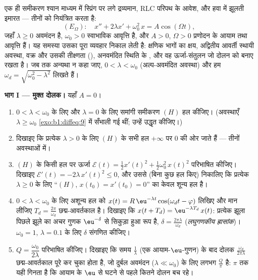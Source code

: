 \begin{problem}\label{pb:b1:diffeq:1}
एक ही समीकरण श्यान माध्यम में स्प्रिंग पर लगे द्रव्यमान, RLC परिपथ के आवेश,
और हवा में झूलती इमारत --- तीनों को नियंत्रित करता है:
\[
(E_\Omega)\colon\quad
x'' + 2\lambda x' + \omega_0^2\,x = A\cos(\Omega t),
\]
जहाँ $\lambda \geq 0$ अवमंदन है, $\omega_0 > 0$ स्वाभाविक आवृत्ति है, और $A
> 0$, $\Omega > 0$ प्रणोदन के आयाम तथा आवृत्ति हैं। यह समस्या उसका पूरा
व्यवहार निकाल लेती है: क्षणिक भागों का क्षय, अद्वितीय आवर्ती स्थायी अवस्था,
 वक्र और उसकी तीक्ष्णता (\emph{}), अनवमंदित स्थिति के
, और वह ऊर्जा-संतुलन जो दोलन को बनाए रखता
है। जब तक अन्यथा न कहा जाए, $0 < \lambda <
\omega_0$ (अल्प-अवमंदित अवस्था) और हम $\omega_d = \sqrt{\omega_0^2 -
\lambda^2}$ लिखते हैं।

\medskip \noindent\textbf{भाग I --- मुक्त दोलक।} यहाँ $A = 0$।
\begin{enumerate}
  \item $0 < \lambda < \omega_0$ के लिए और $\lambda = 0$ के लिए समांगी
  समीकरण $(H)$ हल कीजिए। (अवस्थाएँ $\lambda \geq \omega_0$
  \cref{exo:b1:diffeq:9} में सँभाली गई थीं; उन्हें उद्धृत कीजिए।)
  \item दिखाइए कि प्रत्येक $\lambda > 0$ के लिए $(H)$ के सभी हल $+\infty$ पर
  $0$ की ओर जाते हैं --- तीनों अवस्थाओं में।
  \item $(H)$ के किसी हल पर ऊर्जा $\mathcal E(t) = \frac12 x'(t)^2 +
  \frac12\omega_0^2\,x(t)^2$ परिभाषित कीजिए। दिखाइए $\mathcal E'(t) =
  -2\lambda\,x'(t)^2 \leq 0$, और उससे (बिना कुछ हल किए) निकालिए कि प्रत्येक
  $\lambda \geq 0$ के लिए  ``$(H)$, $x(t_0) = x'(t_0) = 0$'' का
  केवल शून्य हल है।
  \item $0 < \lambda < \omega_0$ के लिए अशून्य हल को $x(t) =
  R\,\eu^{-\lambda t}\cos(\omega_d t - \varphi)$ लिखिए और मान लीजिए $T_d =
  \frac{2\pi}{\omega_d}$ छद्म-आवर्तकाल है। दिखाइए कि $x(t + T_d) =
  \eu^{-\lambda T_d}\,x(t)$: प्रत्येक झूला पिछले झूले का अचर गुणक
  $\eu^{-\delta}$ से सिकुड़ा हुआ रूप है, $\delta =
  \frac{2\pi\lambda}{\omega_d}$ (\emph{लघुगणकीय ह्रासांक})। $\omega_0 = 1$,
  $\lambda = 0.1$ के लिए $\delta$ संगणित कीजिए।
  \item \emph{} $Q = \dfrac{\omega_0}{2\lambda}$
  परिभाषित कीजिए। दिखाइए कि समय $\frac1\lambda$ (एक आयाम-$\eu$-गुणन) के बाद
  दोलक $\frac{\omega_d}{2\pi\lambda}$ छद्म-आवर्तकाल पूरे कर चुका होता है, जो
  दुर्बल अवमंदन ($\lambda \ll \omega_0$) के लिए लगभग $\frac Q\pi$ है:  $\pi$ तक यही गिनता है कि आयाम के $\eu$ से घटने से पहले कितने दोलन बच
  रहे।
\end{enumerate}


\end{problem}
